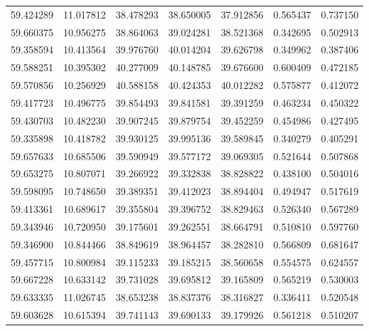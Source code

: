 \begin{tabular}{rrrrrrr}
 59.424289 &  11.017812 &         38.478293 &         38.650005 &         37.912856 &  0.565437 &  0.737150 \\
 59.660375 &  10.956275 &         38.864063 &         39.024281 &         38.521368 &  0.342695 &  0.502913 \\
 59.358594 &  10.413564 &         39.976760 &         40.014204 &         39.626798 &  0.349962 &  0.387406 \\
 59.588251 &  10.395302 &         40.277009 &         40.148785 &         39.676600 &  0.600409 &  0.472185 \\
 59.570856 &  10.256929 &         40.588158 &         40.424353 &         40.012282 &  0.575877 &  0.412072 \\
 59.417723 &  10.496775 &         39.854493 &         39.841581 &         39.391259 &  0.463234 &  0.450322 \\
 59.430703 &  10.482230 &         39.907245 &         39.879754 &         39.452259 &  0.454986 &  0.427495 \\
 59.335898 &  10.418782 &         39.930125 &         39.995136 &         39.589845 &  0.340279 &  0.405291 \\
 59.657633 &  10.685506 &         39.590949 &         39.577172 &         39.069305 &  0.521644 &  0.507868 \\
 59.653275 &  10.807071 &         39.266922 &         39.332838 &         38.828822 &  0.438100 &  0.504016 \\
 59.598095 &  10.748650 &         39.389351 &         39.412023 &         38.894404 &  0.494947 &  0.517619 \\
 59.413361 &  10.689617 &         39.355804 &         39.396752 &         38.829463 &  0.526340 &  0.567289 \\
 59.343946 &  10.720950 &         39.175601 &         39.262551 &         38.664791 &  0.510810 &  0.597760 \\
 59.346900 &  10.844466 &         38.849619 &         38.964457 &         38.282810 &  0.566809 &  0.681647 \\
 59.457715 &  10.800984 &         39.115233 &         39.185215 &         38.560658 &  0.554575 &  0.624557 \\
 59.667228 &  10.633142 &         39.731028 &         39.695812 &         39.165809 &  0.565219 &  0.530003 \\
 59.633335 &  11.026745 &         38.653238 &         38.837376 &         38.316827 &  0.336411 &  0.520548 \\
 59.603628 &  10.615394 &         39.741143 &         39.690133 &         39.179926 &  0.561218 &  0.510207 \\

\end{tabular}
